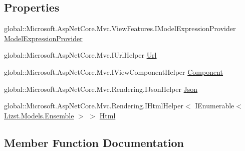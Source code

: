 \subsection*{Properties}
\begin{DoxyCompactItemize}
\item 
global\+::\+Microsoft.\+Asp\+Net\+Core.\+Mvc.\+View\+Features.\+I\+Model\+Expression\+Provider \mbox{\hyperlink{class_asp_net_core_1_1_views___ensemble___index_adb2de966e034016960af0ae60f18e563}{Model\+Expression\+Provider}}
\item 
global\+::\+Microsoft.\+Asp\+Net\+Core.\+Mvc.\+I\+Url\+Helper \mbox{\hyperlink{class_asp_net_core_1_1_views___ensemble___index_a0692a2f4c1822f2983b4d9cc91ce04fe}{Url}}
\item 
global\+::\+Microsoft.\+Asp\+Net\+Core.\+Mvc.\+I\+View\+Component\+Helper \mbox{\hyperlink{class_asp_net_core_1_1_views___ensemble___index_ad36fb66b3efe7c992e76c70173f30dd8}{Component}}
\item 
global\+::\+Microsoft.\+Asp\+Net\+Core.\+Mvc.\+Rendering.\+I\+Json\+Helper \mbox{\hyperlink{class_asp_net_core_1_1_views___ensemble___index_ac26399afa734f41b364ef235122cc878}{Json}}
\item 
global\+::\+Microsoft.\+Asp\+Net\+Core.\+Mvc.\+Rendering.\+I\+Html\+Helper$<$ I\+Enumerable$<$ \mbox{\hyperlink{class_lizst_1_1_models_1_1_ensemble}{Lizst.\+Models.\+Ensemble}} $>$ $>$ \mbox{\hyperlink{class_asp_net_core_1_1_views___ensemble___index_a5d22b9f5e9c60beebcf9198f01e684ba}{Html}}
\end{DoxyCompactItemize}


\subsection{Member Function Documentation}
\mbox{\label{class_asp_net_core_1_1_views___ensemble___index_a724d17e6d781c9b2473e5b7748456618}} 

